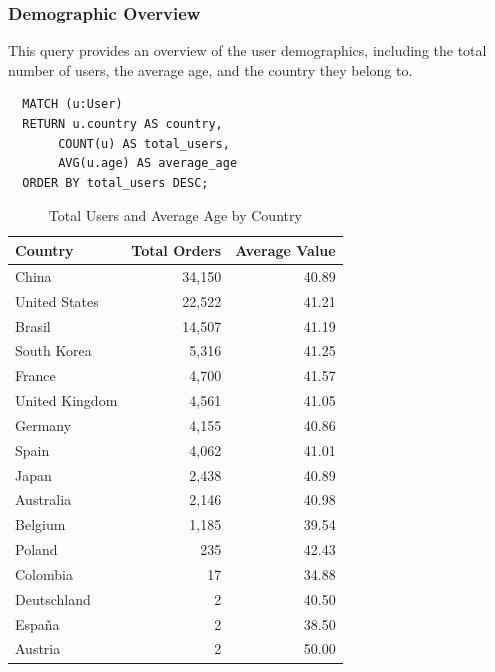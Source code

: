 \documentclass[a4paper,12pt]{article}
\begin{document}
\subsubsection{Demographic Overview}
This query provides an overview of the user demographics, including the total number of users, the average age, and the country they belong to.
\begin{verbatim}
  MATCH (u:User)
  RETURN u.country AS country, 
       COUNT(u) AS total_users,
       AVG(u.age) AS average_age
  ORDER BY total_users DESC;
\end{verbatim}
\begin{table}[h!]
  \centering
  \caption{Total Users and Average Age by Country}
  \label{tab:Average_age}
  \begin{tabular}{l r r}
      \toprule
      \textbf{Country} & \textbf{Total Orders} & \textbf{Average Value} \\
      \midrule
      China           & 34,150  & 40.89 \\
      United States   & 22,522  & 41.21 \\
      Brasil          & 14,507  & 41.19 \\
      South Korea     & 5,316   & 41.25 \\
      France          & 4,700   & 41.57 \\
      United Kingdom  & 4,561   & 41.05 \\
      Germany         & 4,155   & 40.86 \\
      Spain           & 4,062   & 41.01 \\
      Japan           & 2,438   & 40.89 \\
      Australia       & 2,146   & 40.98 \\
      Belgium         & 1,185   & 39.54 \\
      Poland          & 235     & 42.43 \\
      Colombia        & 17      & 34.88 \\
      Deutschland     & 2       & 40.50 \\
      España          & 2       & 38.50 \\
      Austria         & 2       & 50.00 \\
      \bottomrule
  \end{tabular}
\end{table}
\end{document}
